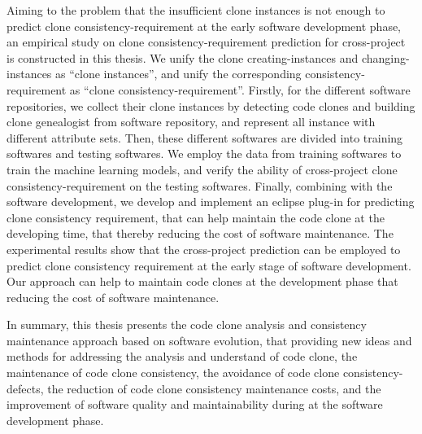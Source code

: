 {Aiming to the problem that the insufficient clone instances is not enough to predict clone consistency-requirement at the early software development phase, an empirical study on clone consistency-requirement prediction for cross-project is constructed in this thesis.
We unify the clone creating-instances and changing-instances as ``clone instances'', and unify the corresponding consistency-requirement as ``clone consistency-requirement''.
Firstly, for the different software repositories, we collect their clone instances by detecting code clones and building clone genealogist from software repository, and represent all instance with different attribute sets.
Then, these different softwares are divided into training softwares and testing softwares. We employ the data from training softwares to train the machine learning models, and verify the ability of cross-project clone consistency-requirement on the testing softwares.
Finally, combining with the software development, we develop and implement an eclipse plug-in for predicting clone consistency requirement, that can help maintain the code clone at the developing time, that thereby reducing the cost of software maintenance.
The experimental results show that the cross-project prediction can be employed to predict clone consistency requirement at the early stage of software development.
Our approach can help to maintain code clones at the development phase that reducing the cost of software maintenance.

In summary, this thesis presents the code clone analysis and consistency maintenance approach based on software evolution, that providing new ideas and methods for addressing the analysis and understand of code clone, the maintenance of code clone consistency, the avoidance of code clone consistency-defects, the reduction of code clone consistency maintenance costs, and the improvement of software quality and maintainability during at the software development phase.
}

\makecover
\clearpage 
